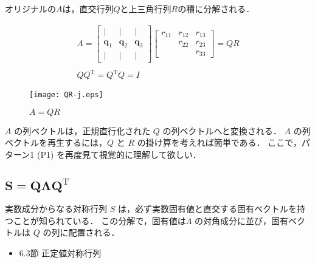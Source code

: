 \documentclass[letterpaper]{article}
\DeclareRobustCommand\transp{^{\mathrm{T}}}
\begin{document}
オリジナルの$A$は，直交行列$Q$と上三角行列$R$の積に分解される．

\begin{gather*}
  A = 
  \begin{bmatrix}
    | & | & |\\
    \bm{q}_1 & \bm{q}_2 & \bm{q}_3\\
    | & | & |
  \end{bmatrix}
  \begin{bmatrix}
    r_{11} & r_{12} & r_{13}\\
           & r_{22} & r_{23}\\
           &        & r_{33}
  \end{bmatrix} = QR\\
  \\
  Q Q\transp=Q\transp Q = I
\end{gather*}
\begin{figure}[H]
  \centering
  \texttt{[image: QR-j.eps]}
  \caption{$A=QR$}
\end{figure}
$A$ の列ベクトルは，正規直行化された $Q$ の列ベクトルへと変換される．
$A$ の列ベクトルを再生するには，$Q$ と $R$ の掛け算を考えれば簡単である．
ここで，パターン1 (P1) を再度見て視覚的に理解して欲しい．

\subsection{$\boldsymbol{S=Q \Lambda Q\transp}$}

実数成分からなる対称行列 $S$ は，必ず実数固有値と直交する固有ベクトルを持つことが知られている．
この分解で，固有値は$\Lambda$ の対角成分に並び，固有ベクトルは $Q$ の列に配置される．

\begin{itemize}
  \item 6.3節 正定値対称行列
\end{itemize}
\end{document}
